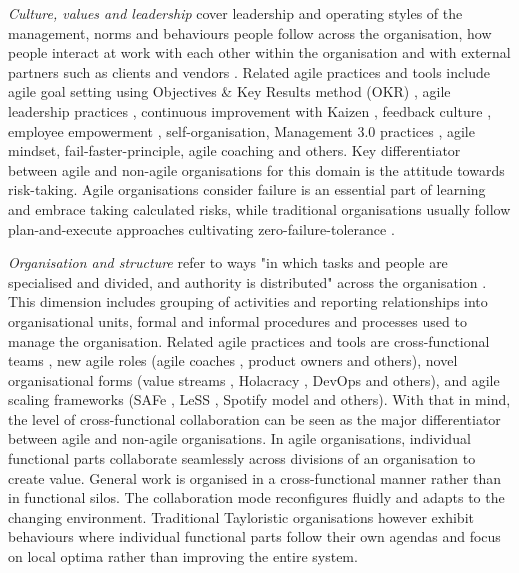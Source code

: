 \documentclass{article}
\begin{document}
\textit{Culture, values and leadership} cover leadership and operating styles of the management, norms and behaviours people follow across the organisation, how people interact at work with each other within the organisation and with external partners such as clients and vendors \cite{bradach1996}. Related agile practices and tools include agile goal setting using Objectives \& Key Results method (OKR) \cite{niven2016}, agile leadership practices \cite{baker2007}, continuous improvement with Kaizen \cite{berger1997}, feedback culture \cite{strode2009}, employee empowerment \cite{menon2001}, self-organisation, Management 3.0 practices \cite{appelo2016}, agile mindset, fail-faster-principle, agile coaching \cite{davies2009} and others. Key differentiator between agile and non-agile organisations for this domain is the attitude towards risk-taking. Agile organisations consider failure is an essential part of learning and embrace taking calculated risks, while traditional organisations usually follow plan-and-execute approaches cultivating zero-failure-tolerance \cite{strode2009}.

\textit{Organisation and structure} refer to ways "in which tasks and people are specialised and divided, and authority is distributed" across the organisation \cite{bradach1996}. This dimension includes grouping of activities and reporting relationships into organisational units, formal and informal procedures and processes used to manage the organisation. Related agile practices and tools are  cross-functional teams \cite{parker2003}, new agile roles (agile coaches \cite{davies2009}, product owners \cite{bass2015} and others), novel organisational forms (value streams \cite{rother2003}, Holacracy \cite{Robertson2015, bernstein2016}, DevOps \cite{ebert2016} and others), and agile scaling frameworks (SAFe \cite{leffingwell2018safe}, LeSS \cite{larman2016large}, Spotify model \cite{Kniberg2012} and others). With that in mind, the level of cross-functional collaboration can be seen as the major differentiator between agile and non-agile organisations. In agile organisations, individual functional parts collaborate seamlessly across divisions of an organisation to create value. General work is organised in a cross-functional manner rather than in functional silos. The collaboration mode reconfigures fluidly and adapts to the changing environment. Traditional Tayloristic organisations however exhibit behaviours where individual functional parts follow their own agendas and focus on local optima rather than improving the entire system.
\end{document}
